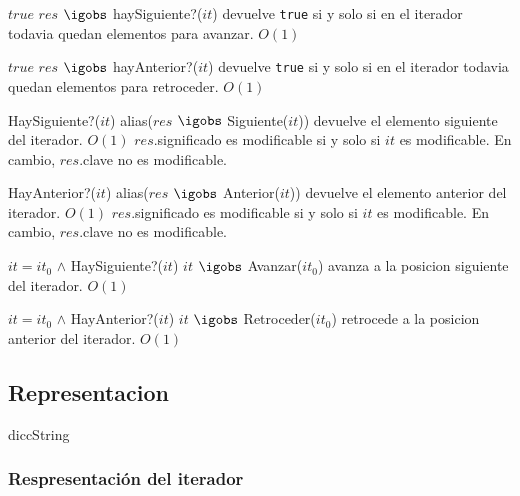 	{$true$}  
  {$res$ $\igobs$ haySiguiente?($it$)}
  {devuelve \texttt{true} si y solo si en el iterador todavia quedan elementos para avanzar.}
  {$O(1)$}
  {}

	{$true$}    
  {$res$ $\igobs$ hayAnterior?($it$)}
  {devuelve \texttt{true} si y solo si en el iterador todavia quedan elementos para retroceder.}
  {$O(1)$}
  {}

  {HaySiguiente?($it$)}
  {alias($res$ $\igobs$ Siguiente($it$))}
  {devuelve el elemento siguiente del iterador.}
  {$O(1)$}
  {$res$.significado es modificable si y solo si $it$ es modificable.  En cambio, $res$.clave no es modificable.}
  

  {HayAnterior?($it$)}
  {alias($res$ $\igobs$ Anterior($it$))}
  {devuelve el elemento anterior del iterador.}
  {$O(1)$}
  {$res$.significado es modificable si y solo si $it$ es modificable.  En cambio, $res$.clave no es modificable.}




  {$it = it_0$ $\land$ HaySiguiente?($it$)}
  {$it$ $\igobs$ Avanzar($it_0$)}
  {avanza a la posicion siguiente del iterador.}
  {$O(1)$}
  {}

  {$it = it_0$ $\land$ HayAnterior?($it$)}
  {$it$ $\igobs$ Retroceder($it_0$)}
  {retrocede a la posicion anterior del iterador.}
  {$O(1)$}
  {}



\subsection{Representacion}
diccString





\subsubsection*{Respresentación del iterador}


